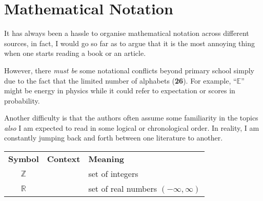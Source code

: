 \section{Mathematical Notation}

It has always been a hassle to organise mathematical notation across different sources,
in fact, I would go so far as to argue that it is the most annoying thing
when one starts reading a book or an article.

However, there \textit{must be} some notational conflicts beyond primary school
simply due to the fact that the limited number of alphabets (\textbf{26}).
For example, ``$\mathbb{E}$'' might be energy in physics
while it could refer to expectation or scores in probability.

Another difficulty is that  the authors often assume some familiarity in the topics
\textit{also} I am expected to read in some logical or chronological order.
In reality, I am constantly jumping back and forth between one literature to another.

\begin{table}[h!]
    \centering\renewcommand{\arraystretch}{1.2}
    \begin{tabular}{ccl}
        \textbf{Symbol} & \textbf{Context} & \textbf{Meaning}                       \\
        $\mathbb{Z}$    &                  & set of integers                        \\
        $\mathbb{R}$    &                  & set of real numbers $(-\infty,\infty)$ \\
    \end{tabular}
    \label{tab:real-notation}
\end{table}
\newpage